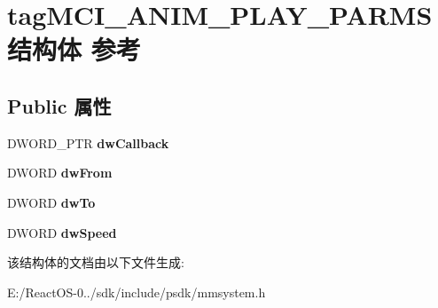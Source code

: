 \hypertarget{structtag_m_c_i___a_n_i_m___p_l_a_y___p_a_r_m_s}{}\section{tag\+M\+C\+I\+\_\+\+A\+N\+I\+M\+\_\+\+P\+L\+A\+Y\+\_\+\+P\+A\+R\+M\+S结构体 参考}
\label{structtag_m_c_i___a_n_i_m___p_l_a_y___p_a_r_m_s}
\subsection*{Public 属性}
\begin{DoxyCompactItemize}
\item 
\mbox{\label{structtag_m_c_i___a_n_i_m___p_l_a_y___p_a_r_m_s_a0af1957da622144c357bf81dc57db3eb}} 
D\+W\+O\+R\+D\+\_\+\+P\+TR {\bfseries dw\+Callback}
\item 
\mbox{\label{structtag_m_c_i___a_n_i_m___p_l_a_y___p_a_r_m_s_a6ac6670b644101cae7c630b41b27ced1}} 
D\+W\+O\+RD {\bfseries dw\+From}
\item 
\mbox{\label{structtag_m_c_i___a_n_i_m___p_l_a_y___p_a_r_m_s_a4c98c331595ea804a3887f4429437fd2}} 
D\+W\+O\+RD {\bfseries dw\+To}
\item 
\mbox{\label{structtag_m_c_i___a_n_i_m___p_l_a_y___p_a_r_m_s_a20adc5edc454a49749a0c439549898cd}} 
D\+W\+O\+RD {\bfseries dw\+Speed}
\end{DoxyCompactItemize}


该结构体的文档由以下文件生成\+:\begin{DoxyCompactItemize}
\item 
E\+:/\+React\+O\+S-\/0../sdk/include/psdk/mmsystem.\+h\end{DoxyCompactItemize}
